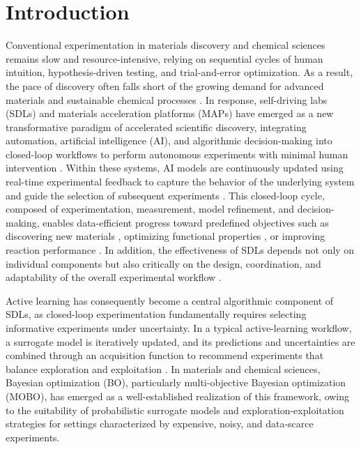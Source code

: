 \section{Introduction}

Conventional experimentation in materials discovery and chemical sciences remains slow and resource-intensive, relying on sequential cycles of human intuition, hypothesis-driven testing, and trial-and-error optimization. As a result, the pace of discovery often falls short of the growing demand for advanced materials and sustainable chemical processes \cite{lee2026toward, bayley2024autonomous}. In response, self-driving labs (SDLs) and materials acceleration platforms (MAPs) have emerged as a new transformative paradigm of accelerated scientific discovery, integrating automation, artificial intelligence (AI), and algorithmic decision-making into closed-loop workflows to perform autonomous experiments with minimal human intervention \cite{lee2026toward, bayley2024autonomous, hickman2023self, hase2019next}. Within these systems, AI models are continuously updated using real-time experimental feedback to capture the behavior of the underlying system and guide the selection of subsequent experiments \cite{flores2020materials,roch2020chemos, sim2024chemos}. This closed-loop cycle, composed of experimentation, measurement, model refinement, and decision-making, enables data-efficient progress toward predefined objectives such as discovering new materials \cite{szymanski2023autonomous}, optimizing functional properties \cite{macleod2020self}, or improving reaction performance \cite{burger2020mobile}. In addition, the effectiveness of SDLs depends not only on individual components but also critically on the design, coordination, and adaptability of the overall experimental workflow \cite{hysmith2024future}.

Active learning has consequently become a central algorithmic component of SDLs, as closed-loop experimentation fundamentally requires selecting informative experiments under uncertainty. In a typical active-learning workflow, a surrogate model is iteratively updated, and its predictions and uncertainties are combined through an acquisition function to recommend experiments that balance exploration and exploitation \cite{lookman2019active}. In materials and chemical sciences, Bayesian optimization (BO), particularly multi-objective Bayesian optimization (MOBO), has emerged as a well-established realization of this framework, owing to the suitability of probabilistic surrogate models and exploration-exploitation strategies for settings characterized by expensive, noisy, and data-scarce experiments. 

